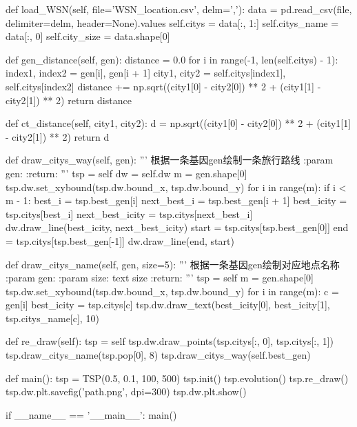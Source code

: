 \documentclass{ctexart}
\begin{document}
\begin{python}
    def load_WSN(self, file='WSN_location.csv', delm=','):
        data = pd.read_csv(file, delimiter=delm, header=None).values
        self.citys = data[:, 1:]
        self.citys_name = data[:, 0]
        self.city_size = data.shape[0]

    def gen_distance(self, gen):
        distance = 0.0
        for i in range(-1, len(self.citys) - 1):
            index1, index2 = gen[i], gen[i + 1]
            city1, city2 = self.citys[index1], self.citys[index2]
            distance += np.sqrt((city1[0] - city2[0]) ** 2 + (city1[1] - city2[1]) ** 2)
        return distance

    def ct_distance(self, city1, city2):
        d = np.sqrt((city1[0] - city2[0]) ** 2 + (city1[1] - city2[1]) ** 2)
        return d

    def draw_citys_way(self, gen):
        '''
        根据一条基因gen绘制一条旅行路线
        :param gen:
        :return:
        '''
        tsp = self
        dw = self.dw
        m = gen.shape[0]
        tsp.dw.set_xybound(tsp.dw.bound_x, tsp.dw.bound_y)
        for i in range(m):
            if i < m - 1:
                best_i = tsp.best_gen[i]
                next_best_i = tsp.best_gen[i + 1]
                best_icity = tsp.citys[best_i]
                next_best_icity = tsp.citys[next_best_i]
                dw.draw_line(best_icity, next_best_icity)
        start = tsp.citys[tsp.best_gen[0]]
        end = tsp.citys[tsp.best_gen[-1]]
        dw.draw_line(end, start)

    def draw_citys_name(self, gen, size=5):
        '''
        根据一条基因gen绘制对应地点名称
        :param gen:
        :param size: text size
        :return:
        '''
        tsp = self
        m = gen.shape[0]
        tsp.dw.set_xybound(tsp.dw.bound_x, tsp.dw.bound_y)
        for i in range(m):
            c = gen[i]
            best_icity = tsp.citys[c]
            tsp.dw.draw_text(best_icity[0], best_icity[1], tsp.citys_name[c], 10)

    def re_draw(self):
        tsp = self
        tsp.dw.draw_points(tsp.citys[:, 0], tsp.citys[:, 1])
        tsp.draw_citys_name(tsp.pop[0], 8)
        tsp.draw_citys_way(self.best_gen)


def main():
    tsp = TSP(0.5, 0.1, 100, 500)
    tsp.init()
    tsp.evolution()
    tsp.re_draw()
    tsp.dw.plt.savefig('path.png', dpi=300)
    tsp.dw.plt.show()


if __name__ == '__main__':
    main()

    \end{python}
\end{document}
